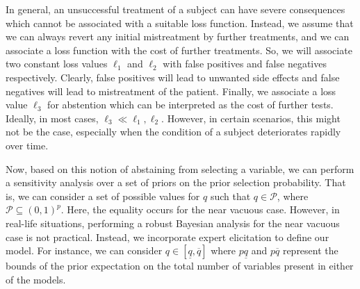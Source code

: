 \documentclass{amsart}
\begin{document}
In general, an unsuccessful treatment of a subject can have severe consequences 
which cannot be associated with a suitable loss function. Instead, we
assume that we can always revert any initial mistreatment by further treatments, 
and we can associate a loss function with the cost of further treatments.
So, we will associate two constant loss values $\ell_1$ and $\ell_2$ 
with false positives and false negatives respectively. 
Clearly, false positives will lead to unwanted side effects and
false negatives will lead to mistreatment of the patient. Finally, we associate
a loss value $\ell_3$ for abstention which can be interpreted as the cost of further tests.
Ideally, in most cases, $\ell_3\ll \ell_1,\ell_2$. However, in certain scenarios,
this might not be the case, especially when the condition of a subject deteriorates rapidly
over time.

Now, based on this notion of abstaining from selecting a variable, we can perform
a sensitivity analysis over a set of priors on the prior selection probability.
That is, we can consider a set of possible values for $q$ such that
$q\in\mathcal{P}$, where $\mathcal{P} \subseteq \left(0, 1\right)^{p}$.
Here, the equality occurs for the near vacuous case. However, in real-life
situations, performing a robust Bayesian analysis for the near vacuous case is 
not practical. Instead, we incorporate expert elicitation to define our model.
For instance, we can consider $q\in \left[\underline{q}, \overline{q}\right]$
where $p\underline{q}$ and $p\overline{q}$ represent the bounds of the prior expectation on the
total number of variables present in either of the models.
\end{document}
